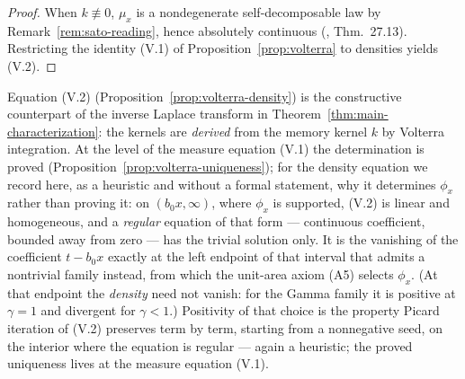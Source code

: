 \begin{proof}
When $k \not\equiv 0$, $\mu_x$ is a nondegenerate self-decomposable law by
Remark~\ref{rem:sato-reading}, hence absolutely continuous (,
Thm.~27.13). Restricting the identity (V.1) of Proposition~\ref{prop:volterra} to densities
yields (V.2).
\end{proof}

Equation (V.2) (Proposition~\ref{prop:volterra-density}) is the constructive counterpart of
the inverse Laplace transform in
Theorem~\ref{thm:main-characterization}: the kernels are \emph{derived} from the memory
kernel $k$ by Volterra integration. At the level of the measure equation (V.1) the
determination is proved (Proposition~\ref{prop:volterra-uniqueness}); for the density
equation we record here, as a heuristic and without a formal statement, why it
determines $\phi_x$ rather than proving it: on $(b_0x, \infty)$, where $\phi_x$ is supported,
(V.2) is linear and homogeneous, and a \emph{regular} equation of that form --- continuous
coefficient, bounded away from zero --- has the trivial solution only. It is the vanishing of
the coefficient $t - b_0x$ exactly at the left endpoint of that interval that admits a
nontrivial family instead, from which the unit-area axiom (A5) selects $\phi_x$. (At that
endpoint the \emph{density} need not vanish: for the Gamma family it is positive at
$\gamma = 1$ and divergent for $\gamma < 1$.) Positivity
of that choice is the property Picard iteration of (V.2) preserves term by term, starting
from a nonnegative seed, on the interior where the equation is regular --- again a
heuristic; the proved uniqueness lives at the measure equation (V.1).

